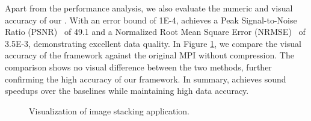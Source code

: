Apart from the performance analysis, we also evaluate the numeric and visual accuracy of our {\pname}. With an error bound of 1E-4, {\pname} achieves a Peak Signal-to-Noise Ratio (PSNR)~\cite{PSNR} of 49.1 and a Normalized Root Mean Square Error (NRMSE)~\cite{shcherbakov2013errormetrics} of 3.5E-3, demonstrating excellent data quality. In Figure \ref{fig-image-stacking-quality}, we compare the visual accuracy of the {\pname} framework against the original MPI without compression. The comparison shows no visual difference between the two methods, further confirming the high accuracy of our {\pname} framework. In summary, {\pname} achieves sound speedups over the baselines while maintaining high data accuracy.


\begin{figure}[ht]
    \centering
    \hspace{-2mm}
    \caption{Visualization of image stacking application.}
    \label{fig-image-stacking-quality}
\end{figure}

